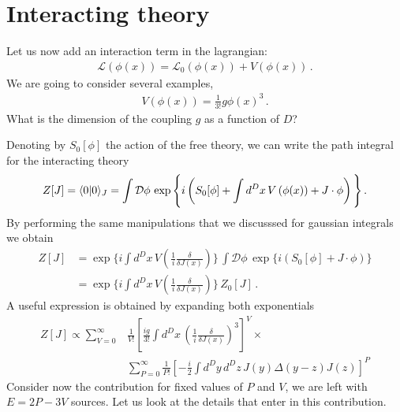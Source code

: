 \section{Interacting theory}
\label{sec:interacting-theory}

Let us now add an interaction term in the lagrangian:
\begin{align}
  \mathcal{L}\left(\phi(x)\right) = 
  \mathcal{L}_0\left(\phi(x)\right) + V\left(\phi(x)\right)\, .
\end{align}
We are going to consider several examples, \eg
\begin{align}
  V\left(\phi(x)\right) = \frac{1}{3!} g \phi(x)^3\, .
\end{align}
What is the dimension of the coupling $g$ as a function of $D$?

Denoting by $S_0[\phi]$ the action of the free theory, we can write
the path integral for the interacting theory
\begin{align}
  Z[J] = \langle 0 | 0 \rangle_J = \int \mathcal{D}\phi\, 
  \exp\Bigg\{i \left( S_0[\phi] + \int d^Dx\,  V\left(\phi(x)\right) 
  + J \cdot \phi \right) \Bigg\}\, .
\end{align}
By performing the same manipulations that we discusssed for 
gaussian integrals we obtain
\begin{align}
  Z[J] &= \exp \Bigg\{i \int d^Dx\,  
         V\left(\frac{1}{i}\frac{\delta}{\delta J(x)}\right) \Bigg\}\, 
         \int \mathcal{D}\phi\, 
         \exp\Bigg\{i \left( S_0[\phi]  
         + J \cdot \phi \right) \Bigg\} \\
       &= \exp \Bigg\{i \int d^Dx\,  
         V\left(\frac{1}{i}\frac{\delta}{\delta J(x)}\right) \Bigg\}\, 
         Z_0[J]\, .
\end{align}
A useful expression is obtained by expanding both exponentials
\begin{align}
  Z[J] \propto 
  \sum_{V=0}^\infty & \frac{1}{V!} \left[
                      \frac{i g}{3!} \int d^Dx\, 
                      \left(\frac{1}{i}\frac{\delta}{\delta J(x)}\right)^3
                      \right]^V \times \\
  \label{eq:DoubleExpExp}
                    & \sum_{P=0}^\infty \frac{1}{P!} \left[
                      -\frac{i}{2} \int d^Dy\, d^Dz\, 
                      J(y) \Delta(y-z) J(z)
                      \right]^P
\end{align}
Consider now the contribution for fixed values of $P$ and $V$, we are
left with $E=2P-3V$ sources. Let us look at the details that enter in
this contribution. 
